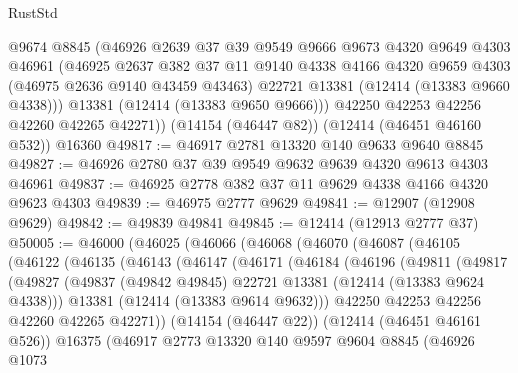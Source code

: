 \begin{lexlean}{RustStd}
\begin{coremodule}
{\begin{coremodule}
{{{{{{{{{{{{{{{{{{{{{{{{{{{{{{{{{{{{{{{{{{{{{{{{{{        @9674
        @8845
        (@46926
          @2639
          @37
          @39
          @9549
          @9666
          @9673
          @4320
          @9649
          @4303
          @46961
          (@46925
            @2637
            @382
            @37
            @11
            @9140
            @4338
            @4166
            @4320
            @9659
            @4303
            (@46975 @2636 @9140 @43459 @43463)
            @22721
            @13381
            (@12414 (@13383 @9660 @4338)))
          @13381
          (@12414 (@13383 @9650 @9666)))
        @42250
        @42253
        @42256
        @42260
        @42265
        @42271))
    (@14154 (@46447 @82))
    (@12414 (@46451 @46160 @532))
    @16360
@49817 := @46917 @2781 @13320 @140 @9633 @9640 @8845
@49827 := @46926 @2780 @37 @39 @9549 @9632 @9639 @4320 @9613 @4303 @46961
@49837 := @46925 @2778 @382 @37 @11 @9629 @4338 @4166 @4320 @9623 @4303
@49839 := @46975 @2777 @9629
@49841 := @12907 (@12908 @9629)
@49842 := @49839 @49841
@49845 := @12414 (@12913 @2777 @37)
@50005 := @46000
    (@46025
      (@46066
        (@46068
          (@46070
            (@46087
              (@46105
                (@46122
                  (@46135
                    (@46143
                      (@46147
                        (@46171
                          (@46184
                            (@46196
                              (@49811
                                (@49817
                                  (@49827
                                    (@49837
                                      (@49842 @49845)
                                      @22721
                                      @13381
                                      (@12414 (@13383 @9624 @4338)))
                                    @13381
                                    (@12414 (@13383 @9614 @9632)))
                                  @42250
                                  @42253
                                  @42256
                                  @42260
                                  @42265
                                  @42271))
                              (@14154 (@46447 @22))
                              (@12414 (@46451 @46161 @526))
                              @16375
                              (@46917
                                @2773
                                @13320
                                @140
                                @9597
                                @9604
                                @8845
                                (@46926
                                  @1073
}}}}}}}}}}}}}}}}}}}}}}}}}}}}}}}}}}}}}}}}}}}}}}}}}}
\end{coremodule}}
\end{coremodule}
\end{lexlean}
